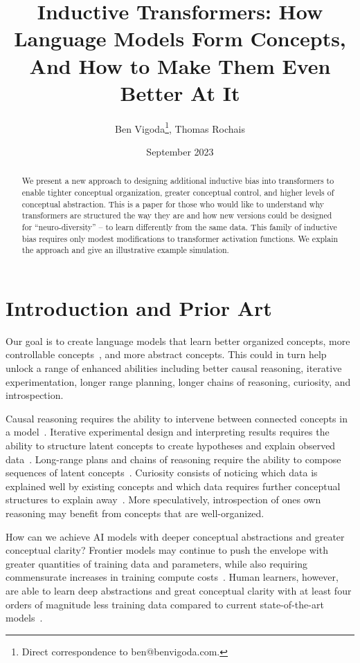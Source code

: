 \documentclass{article}
\title{Inductive Transformers: How Language Models Form Concepts, And How to Make Them Even Better At It}
\author{Ben Vigoda\thanks{Direct correspondence to ben@benvigoda.com.}\hspace{0.5em},  Thomas Rochais}
\date{September 2023}
\begin{document}
\maketitle


\begin{abstract}
We present a new approach to designing additional inductive bias into transformers to enable tighter conceptual organization, greater conceptual control, and higher levels of conceptual abstraction. This is a paper for those who would like to understand why transformers are structured the way they are and how new versions could be designed for ``neuro-diversity'' -- to learn differently from the same data.  This family of inductive bias requires only modest modifications to transformer activation functions. We explain the approach and give an illustrative example simulation.
\end{abstract}


\section{Introduction and Prior Art}

Our goal is to create language models that learn better organized concepts, more controllable concepts~\citep{wang2023easyedit, meng2023massediting, hernandez2023inspecting}, and more abstract concepts. This could in turn help unlock a range of enhanced abilities including better causal reasoning, iterative experimentation, longer range planning, longer chains of reasoning, curiosity, and introspection.

Causal reasoning requires the ability to intervene between connected concepts in a model~\citep{pearl1995causal}. Iterative experimental design and interpreting results requires the ability to structure latent concepts to create hypotheses and explain observed data~\citep{lu2022unified}.  Long-range plans and chains of reasoning require the ability to compose sequences of latent concepts~\citep{lake2017building, oh2017zero, shinn2023reflexion}. Curiosity consists of noticing which data is explained well by existing concepts and which data requires further conceptual structures to explain away~\citep{mazzaglia2022curiosity, chen2022redeeming, pearl1988probabilistic, peterson2019embracing}.  More speculatively, introspection of ones own reasoning may benefit from concepts that are well-organized.

How can we achieve AI models with deeper conceptual abstractions and greater conceptual clarity?  Frontier models may continue to push the envelope with greater quantities of training data and parameters, while also requiring commensurate increases in training compute costs~\citep{amodei2018ai}. Human learners, however, are able to learn deep abstractions and great conceptual clarity with at least four orders of magnitude less training data compared to current state-of-the-art models~\citep{frank2023bridging}.
\end{document}
